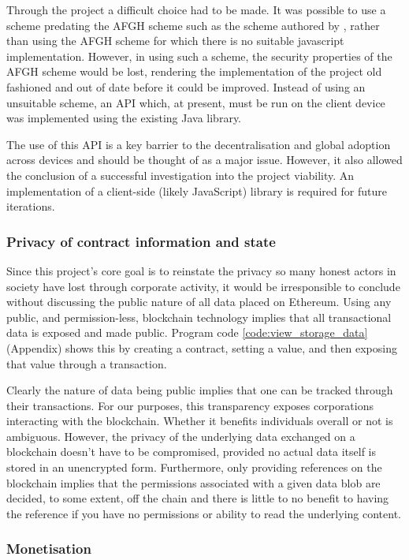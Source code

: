 Through the project a difficult choice had to be made. It was possible to use a scheme predating the AFGH scheme such as the scheme authored by \cite{bbs:1998:book}, rather than using the AFGH scheme for which there is no suitable javascript implementation. However, in using such a scheme, the security properties of the AFGH scheme would be lost, rendering the implementation of the project old fashioned and out of date before it could be improved. Instead of using an unsuitable scheme, an API which, at present, must be run on the client device was implemented using the existing Java library.

The use of this API is a key barrier to the decentralisation and global adoption across devices and should be thought of as a major issue. However, it also allowed the conclusion of a successful investigation into the project viability. An implementation of a client-side (likely JavaScript) library is required for future iterations.

\subsubsection{Privacy of contract information and state}

Since this project's core goal is to reinstate the privacy so many honest actors in society have lost through corporate activity, it would be irresponsible to conclude without discussing the public nature of all data placed on Ethereum. Using any public, and permission-less, blockchain technology implies that all transactional data is exposed and made public. Program code \ref{code:view_storage_data} (Appendix) shows this by creating a contract, setting a value, and then exposing that value through a transaction.

Clearly the nature of data being public implies that one can be tracked through their transactions. For our purposes, this transparency exposes corporations interacting with the blockchain. Whether it benefits individuals overall or not is ambiguous. However, the privacy of the underlying data exchanged on a blockchain doesn't have to be compromised, provided no actual data itself is stored in an unencrypted form. Furthermore, only providing references on the blockchain implies that the permissions associated with a given data blob are decided, to some extent, off the chain and there is little to no benefit to having the reference if you have no permissions or ability to read the underlying content.

\subsubsection{Monetisation}

